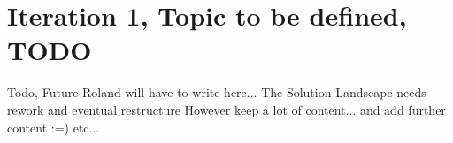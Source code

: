 
\section{Iteration 1, Topic to be defined, TODO}



Todo, Future Roland will have to write here...
The Solution Landscape needs rework and eventual restructure
However keep a lot of content... and add further content :=)
etc...